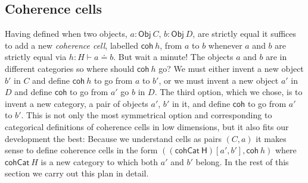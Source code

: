 \documentclass[a4paper]{article}
\newcommand{\Obj}{\mathsf{Obj}}
\newcommand{\homcat}[3]{{#1}[#2,#3]}
\newcommand{\id}{\mathsf{id}}
\newenvironment{ondrej}{\begin{quote}\footnotesize \textbf{Ondrej:}}{\normalsize\end{quote}}
\newcommand{\coh}{\mathsf{coh}}
\begin{document}





\subsection{Coherence cells}
\label{sec:witnessing}
%
Having defined when two objects, $a : \Obj~C$, $b : \Obj~D$, are
strictly equal it suffices to add a new \emph{coherence cell},
labelled $\coh~h$, from $a$ to $b$ whenever $a$ and $b$ are strictly
equal via $h : H \vdash a \doteq b$.
%
But wait a minute! The objects $a$ and $b$ are in different categories
so where should $\coh~h$ go?  We must either invent a new object $b'$
in $C$ and define $\coh~h$ to go from $a$ to $b'$, or we must invent a
new object $a'$ in $D$ and define $\coh$ to go from $a'$ go $b$ in
$D$. The third option, which we chose, is to invent a new category, a
pair of objects $a'$, $b'$ in it, and define $\coh$ to go from $a'$ to
$b'$. This is not only the most symmetrical option and corresponding
to categorical definitions of coherence cells in low dimensions, but
it also fits our development the best: Because we understand cells as
pairs $(C,a)$ it makes sense to define coherence cells in the form
$(\homcat{\mathsf{(cohCat~H)}}{a'}{b'} , \coh~h)$ where
$\mathsf{cohCat}~H$ is a new category to which both $a'$ and $b'$ belong.
In the rest of this section we carry out this plan in detail.
\end{document}
